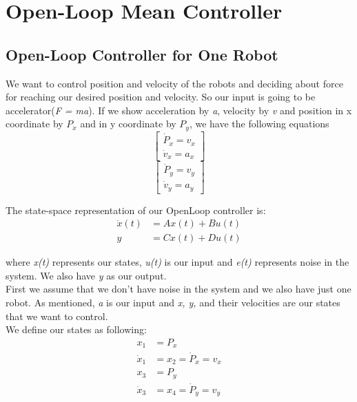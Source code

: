 \documentclass[10pt,letterpaper]{article}
\begin{document}
\section{Open-Loop Mean Controller}
\subsection{Open-Loop Controller for One Robot}
We want to control position and velocity of the robots and deciding about force for reaching our desired position and velocity. So our input is going to be accelerator(\emph{F = ma}). If we show acceleration by \emph{a}, velocity by \emph{v} and position in x coordinate by \emph{$P_x$} and in y coordinate by \emph{$P_y$}, we have the following equations
\begin{equation}
\begin{bmatrix}
\dot{P}_x = v_x \\
\dot{v}_x = a_x
\end{bmatrix}
\end{equation}
\begin{equation}
\begin{bmatrix}
\dot{P}_y = v_y \\
\dot{v}_y = a_y
\end{bmatrix}
\end{equation}



The state-space representation of our OpenLoop controller is: 
\begin{align}
\dot{x}(t)  &=  A x(t) + B u(t) \\
y &= C x(t) + D u(t)\nonumber
\end{align}


where \emph{x(t)} represents our states, \emph{u(t)} is our input and \emph{e(t)} represents noise in the system. We also have \emph{y} as our output.\\
First we assume that we don't have noise in the system and we also have just one robot. As mentioned, \emph{a} is our input and \emph{x, y,} and their velocities are our states that we want to control.\\
We define our states as following:
\begin{align}
x_1 &= P_x \\ \nonumber
\dot{x}_1 &= x_2 = \dot{P}_x = v_x\\\nonumber
x_3 &= P_y\\ \nonumber
 \dot{x}_3 &= x_4 = \dot{P}_y = v_y \nonumber
\end{align}
\end{document}
